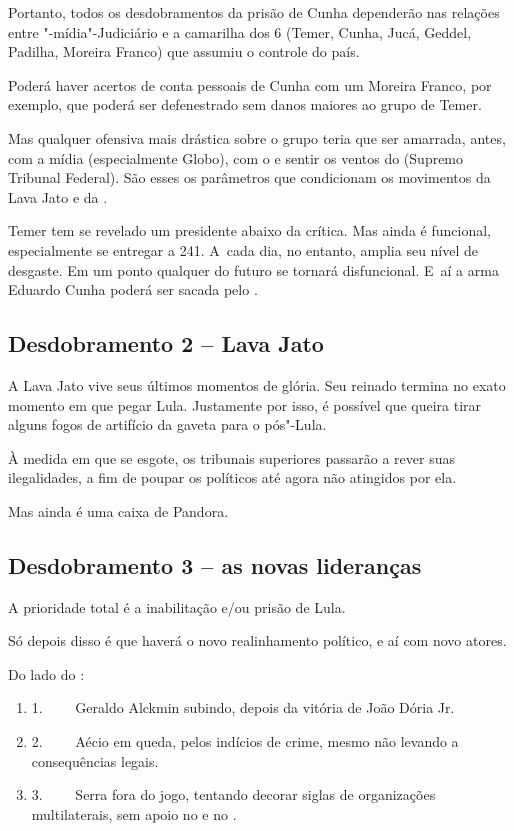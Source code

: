 Portanto, todos os desdobramentos da prisão de Cunha dependerão nas
relações entre "-mídia"-Judiciário e a camarilha dos 6 (Temer, Cunha,
Jucá, Geddel, Padilha, Moreira Franco) que assumiu o controle do país.

Poderá haver acertos de conta pessoais de Cunha com um Moreira Franco,
por exemplo, que poderá ser defenestrado sem danos maiores ao grupo de
Temer.

Mas qualquer ofensiva mais drástica sobre o grupo teria que ser
amarrada, antes, com a mídia (especialmente Globo), com o  e sentir
os ventos do  (Supremo Tribunal Federal). São esses os parâmetros que
condicionam os movimentos da Lava Jato e da .

Temer tem se revelado um presidente abaixo da crítica. Mas ainda é
funcional, especialmente se entregar a  241. A~cada dia, no entanto,
amplia seu nível de desgaste. Em um ponto qualquer do futuro se tornará
disfuncional. E~aí a arma Eduardo Cunha poderá ser sacada pelo .

\subsection{\textbf{Desdobramento 2 -- Lava Jato}}

A Lava Jato vive seus últimos momentos de glória. Seu reinado termina no
exato momento em que pegar Lula. Justamente por isso, é possível que
queira tirar alguns fogos de artifício da gaveta para o pós"-Lula.

À medida em que se esgote, os tribunais superiores passarão a rever suas
ilegalidades, a fim de poupar os políticos até agora não atingidos por
ela.

Mas ainda é uma caixa de Pandora.

\subsection{\textbf{Desdobramento 3 -- as novas lideranças}}

A prioridade total é a inabilitação e/\allowbreak{}ou prisão de Lula.

Só depois disso é que haverá o novo realinhamento político, e aí com
novo atores.

Do lado do :

\begin{enumerate}
\itemsep1pt\parskip0pt
\item
  1.~~~~ Geraldo Alckmin subindo, depois da vitória de João Dória Jr.
\item
  2.~~~~ Aécio em queda, pelos indícios de crime, mesmo não levando a
  consequências legais.
\item
  3.~~~~ Serra fora do jogo, tentando decorar siglas de organizações
  multilaterais, sem apoio no  e no .
\end{enumerate}

